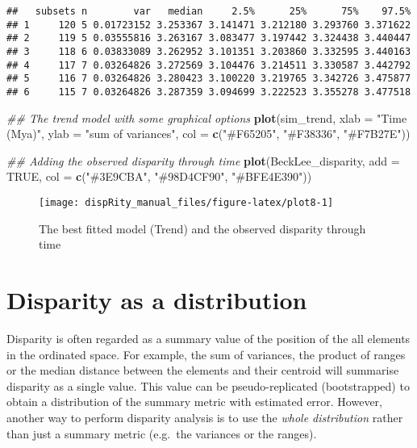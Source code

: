 \documentclass[
]{book}
\newenvironment{Shaded}{\begin{snugshade}}{\end{snugshade}}
\newcommand{\CommentTok}[1]{\textcolor[rgb]{0.56,0.35,0.01}{\textit{#1}}}
\newcommand{\DataTypeTok}[1]{\textcolor[rgb]{0.13,0.29,0.53}{#1}}
\newcommand{\KeywordTok}[1]{\textcolor[rgb]{0.13,0.29,0.53}{\textbf{#1}}}
\newcommand{\NormalTok}[1]{#1}
\newcommand{\OtherTok}[1]{\textcolor[rgb]{0.56,0.35,0.01}{#1}}
\newcommand{\StringTok}[1]{\textcolor[rgb]{0.31,0.60,0.02}{#1}}
\begin{document}
\begin{verbatim}
##   subsets n        var   median     2.5%      25%      75%    97.5%
## 1     120 5 0.01723152 3.253367 3.141471 3.212180 3.293760 3.371622
## 2     119 5 0.03555816 3.263167 3.083477 3.197442 3.324438 3.440447
## 3     118 6 0.03833089 3.262952 3.101351 3.203860 3.332595 3.440163
## 4     117 7 0.03264826 3.272569 3.104476 3.214511 3.330587 3.442792
## 5     116 7 0.03264826 3.280423 3.100220 3.219765 3.342726 3.475877
## 6     115 7 0.03264826 3.287359 3.094699 3.222523 3.355278 3.477518
\end{verbatim}

\begin{Shaded}
\begin{Highlighting}[]
\CommentTok{\#\# The trend model with some graphical options}
\KeywordTok{plot}\NormalTok{(sim\_trend, }\DataTypeTok{xlab =} \StringTok{"Time (Mya)"}\NormalTok{, }\DataTypeTok{ylab =} \StringTok{"sum of variances"}\NormalTok{,}
    \DataTypeTok{col =} \KeywordTok{c}\NormalTok{(}\StringTok{"\#F65205"}\NormalTok{, }\StringTok{"\#F38336"}\NormalTok{, }\StringTok{"\#F7B27E"}\NormalTok{))}

\CommentTok{\#\# Adding the observed disparity through time}
\KeywordTok{plot}\NormalTok{(BeckLee\_disparity, }\DataTypeTok{add =} \OtherTok{TRUE}\NormalTok{, }\DataTypeTok{col =} \KeywordTok{c}\NormalTok{(}\StringTok{"\#3E9CBA"}\NormalTok{, }\StringTok{"\#98D4CF90"}\NormalTok{, }\StringTok{"\#BFE4E390"}\NormalTok{))}
\end{Highlighting}
\end{Shaded}

\begin{figure}

{\centering \texttt{[image: dispRity\_manual\_files/figure-latex/plot8-1]} 

}

\caption{The best fitted model (Trend) and the observed disparity through time}\label{fig:plot8}
\end{figure}

\hypertarget{disparity-distribution}{%
\section{Disparity as a distribution}\label{disparity-distribution}}

Disparity is often regarded as a summary value of the position of the all elements in the ordinated space.
For example, the sum of variances, the product of ranges or the median distance between the elements and their centroid will summarise disparity as a single value.
This value can be pseudo-replicated (bootstrapped) to obtain a distribution of the summary metric with estimated error.
However, another way to perform disparity analysis is to use the \emph{whole distribution} rather than just a summary metric (e.g.~the variances or the ranges).
\end{document}
